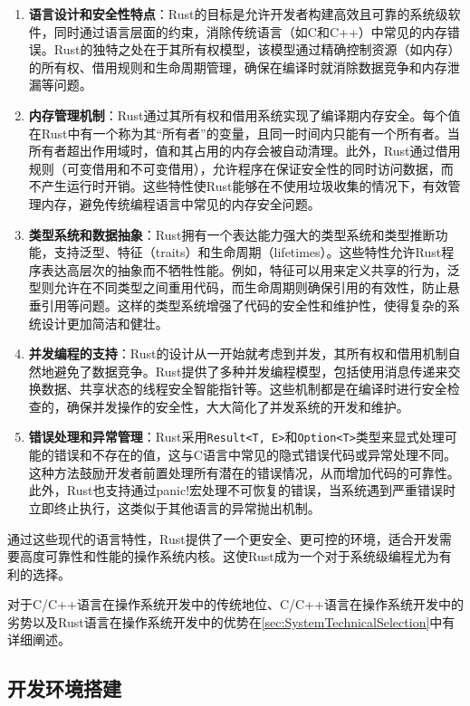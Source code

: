 \begin{enumerate}
    \item \textbf{语言设计和安全性特点}：Rust的目标是允许开发者构建高效且可靠的系统级软件，同时通过语言层面的约束，消除传统语言（如C和C++）中常见的内存错误。Rust的独特之处在于其所有权模型，该模型通过精确控制资源（如内存）的所有权、借用规则和生命周期管理，确保在编译时就消除数据竞争和内存泄漏等问题。
    \item \textbf{内存管理机制}：Rust通过其所有权和借用系统实现了编译期内存安全。每个值在Rust中有一个称为其“所有者”的变量，且同一时间内只能有一个所有者。当所有者超出作用域时，值和其占用的内存会被自动清理。此外，Rust通过借用规则（可变借用和不可变借用），允许程序在保证安全性的同时访问数据，而不产生运行时开销。这些特性使Rust能够在不使用垃圾收集的情况下，有效管理内存，避免传统编程语言中常见的内存安全问题。
    \item \textbf{类型系统和数据抽象}：Rust拥有一个表达能力强大的类型系统和类型推断功能，支持泛型、特征（traits）和生命周期（lifetimes）。这些特性允许Rust程序表达高层次的抽象而不牺牲性能。例如，特征可以用来定义共享的行为，泛型则允许在不同类型之间重用代码，而生命周期则确保引用的有效性，防止悬垂引用等问题。这样的类型系统增强了代码的安全性和维护性，使得复杂的系统设计更加简洁和健壮。
    \item \textbf{并发编程的支持}：Rust的设计从一开始就考虑到并发，其所有权和借用机制自然地避免了数据竞争。Rust提供了多种并发编程模型，包括使用消息传递来交换数据、共享状态的线程安全智能指针等。这些机制都是在编译时进行安全检查的，确保并发操作的安全性，大大简化了并发系统的开发和维护。
    \item \textbf{错误处理和异常管理}：Rust采用\texttt{Result<T, E>}和\texttt{Option<T>}类型来显式处理可能的错误和不存在的值，这与C语言中常见的隐式错误代码或异常处理不同。这种方法鼓励开发者前置处理所有潜在的错误情况，从而增加代码的可靠性。此外，Rust也支持通过panic!宏处理不可恢复的错误，当系统遇到严重错误时立即终止执行，这类似于其他语言的异常抛出机制。
\end{enumerate}

通过这些现代的语言特性，Rust提供了一个更安全、更可控的环境，适合开发需要高度可靠性和性能的操作系统内核。这使Rust成为一个对于系统级编程尤为有利的选择。

对于C/C++语言在操作系统开发中的传统地位、C/C++语言在操作系统开发中的劣势以及Rust语言在操作系统开发中的优势在\cref{sec:SystemTechnicalSelection}中有详细阐述。

\subsection{开发环境搭建}

